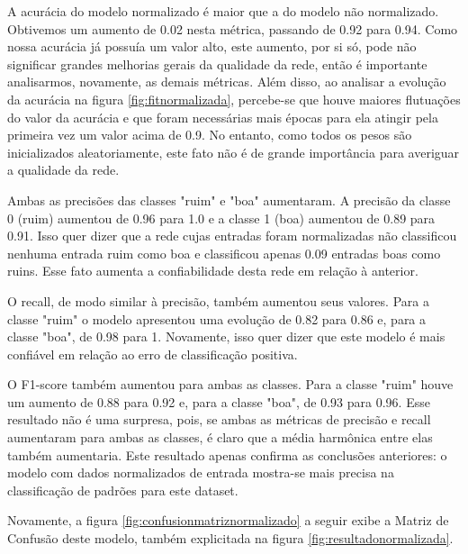 \documentclass[12pt]{article}
\begin{document}
A acurácia do modelo normalizado é maior que a do modelo não normalizado. Obtivemos um aumento de 0.02 nesta métrica, passando de 0.92 para 0.94. Como nossa acurácia já possuía um valor alto, este aumento, por si só, pode não significar grandes melhorias gerais da qualidade da rede, então é importante analisarmos, novamente, as demais métricas. Além disso, ao analisar a evolução da acurácia na figura \ref{fig:fitnormalizada}, percebe-se que houve maiores flutuações do valor da acurácia e que foram necessárias mais épocas para ela atingir pela primeira vez um valor acima de 0.9. No entanto, como todos os pesos são inicializados aleatoriamente, este fato não é de grande importância para averiguar a qualidade da rede.

Ambas as precisões das classes "ruim" e "boa" aumentaram. A precisão da classe 0 (ruim) aumentou de 0.96 para 1.0 e a classe 1 (boa) aumentou de 0.89 para 0.91. Isso quer dizer que a rede cujas entradas foram normalizadas não classificou nenhuma entrada ruim como boa e classificou apenas 0.09 entradas boas como ruins. Esse fato aumenta a confiabilidade desta rede em relação à anterior.

O recall, de modo similar à precisão, também aumentou seus valores. Para a classe "ruim" o modelo apresentou uma evolução de 0.82 para 0.86 e, para a classe "boa", de 0.98 para 1. Novamente, isso quer dizer que este modelo é mais confiável em relação ao erro de classificação positiva.

O F1-score também aumentou para ambas as classes. Para a classe "ruim" houve um aumento de 0.88 para 0.92 e, para a classe "boa", de 0.93 para 0.96. Esse resultado não é uma surpresa, pois, se ambas as métricas de precisão e recall aumentaram para ambas as classes, é claro que a média harmônica entre elas também aumentaria. Este resultado apenas confirma as conclusões anteriores: o modelo com dados normalizados de entrada mostra-se mais precisa na classificação de padrões para este dataset.

Novamente, a figura \ref{fig:confusionmatriznormalizado} a seguir exibe a Matriz de Confusão deste modelo, também explicitada na figura \ref{fig:resultadonormalizada}.
\end{document}
